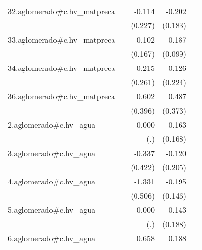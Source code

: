 {\begin{longtable}{l*{4}{D{.}{.}{-1}}}
\addlinespace
32.aglomerado#c.hv\_matpreca&                     &      -0.114         &      -0.202         &                     \\
            &                     &     (0.227)         &     (0.183)         &                     \\
\addlinespace
33.aglomerado#c.hv\_matpreca&                     &      -0.102         &      -0.187         &                     \\
            &                     &     (0.167)         &     (0.099)         &                     \\
\addlinespace
34.aglomerado#c.hv\_matpreca&                     &       0.215         &       0.126         &                     \\
            &                     &     (0.261)         &     (0.224)         &                     \\
\addlinespace
36.aglomerado#c.hv\_matpreca&                     &       0.602         &       0.487         &                     \\
            &                     &     (0.396)         &     (0.373)         &                     \\
\addlinespace
2.aglomerado#c.hv\_agua&                     &       0.000         &       0.163         &                     \\
            &                     &         (.)         &     (0.168)         &                     \\
\addlinespace
3.aglomerado#c.hv\_agua&                     &      -0.337         &      -0.120         &                     \\
            &                     &     (0.422)         &     (0.205)         &                     \\
\addlinespace
4.aglomerado#c.hv\_agua&                     &      -1.331\sym{**} &      -0.195         &                     \\
            &                     &     (0.506)         &     (0.146)         &                     \\
\addlinespace
5.aglomerado#c.hv\_agua&                     &       0.000         &      -0.143         &                     \\
            &                     &         (.)         &     (0.188)         &                     \\
\addlinespace
6.aglomerado#c.hv\_agua&                     &       0.658         &       0.188         &                     \\

\end{longtable}}
